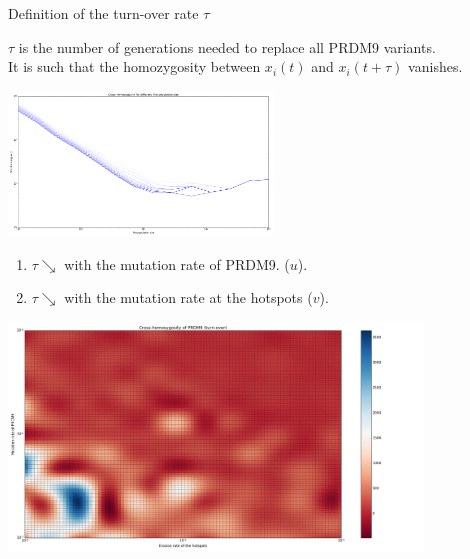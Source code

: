 \documentclass[10pt]{beamer}
\begin{document}
\begin{frame}
	\begin{center}
		\Large
    	Definition of the turn-over rate $\tau$ 
    \end{center}
	$\tau$ is the number of generations needed to replace all PRDM9 variants. \\
	It is such that the homozygosity between $x_i(t)$ and $x_i(t+\tau)$ vanishes.
	\begin{center}
       \includegraphics[width=7cm]{Images/ne-turn-over.png}
	\end{center}
\end{frame}

\begin{frame}
	\begin{center}
		\begin{enumerate}
		\item $\tau \searrow$ with the mutation rate of PRDM9. ($u$).
		
		\item $\tau \searrow$ with the mutation rate at the hotspots ($v$).
		\end{enumerate}
       \includegraphics[width=11cm]{Images/cross-homozygosity-mutation-erosion.png}
	\end{center}
\end{frame}
\end{document}
